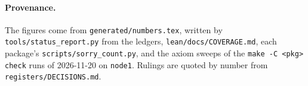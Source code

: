 \paragraph{Provenance.} The figures come from \texttt{generated/numbers.tex}, written by
\texttt{tools/status\_report.py} from the ledgers, \texttt{lean/docs/COVERAGE.md}, each package's
\texttt{scripts/sorry\_count.py}, and the axiom sweeps of the \texttt{make -C <pkg> check} runs of
2026-11-20 on \texttt{node1}. Rulings are quoted by number from \texttt{registers/DECISIONS.md}.


